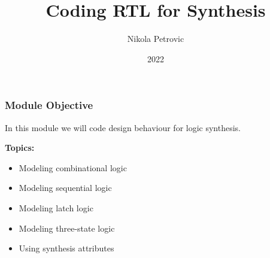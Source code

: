 \documentclass[t, notes, xcolor=table]{beamer}
\title{Coding RTL for Synthesis}
\author{Nikola Petrovic}
\institute{University of Belgrade, School of Electrical Engineering}
\date{2022}
\begin{document}
\frame{\titlepage}

\begin{frame}
\frametitle{Module Objective}
In this module we will code design behaviour for logic synthesis.
\newline

\textbf{Topics:}
\begin{itemize}
\item Modeling combinational logic
\item Modeling sequential logic
\item Modeling latch logic
\item Modeling three-state logic
\item Using synthesis attributes
\end{itemize}
\end{frame}
\end{document}

